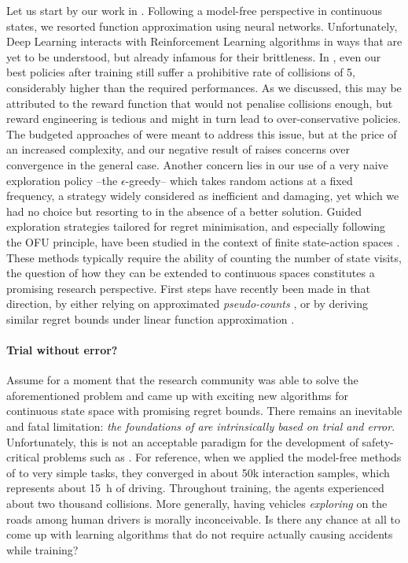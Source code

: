 Let us start by our work in . Following a model-free perspective in continuous states, we resorted function approximation using neural networks. Unfortunately, Deep Learning interacts with Reinforcement Learning algorithms in ways that are yet to be understood, but already infamous for their brittleness. In , even our best policies after training still suffer a prohibitive rate of collisions of \SI{5}{\per}, considerably higher than the required performances. 
As we discussed, this may be attributed to the reward function that would not penalise collisions enough, but reward engineering is tedious and might in turn lead to over-conservative policies. The budgeted approaches of  were meant to address this issue, but at the price of an increased complexity, and our negative result of  raises concerns over convergence in the general case. 
Another concern lies in our use of a very naive exploration policy --the $\epsilon$-greedy-- which takes random actions at a fixed frequency, a strategy widely considered as inefficient and damaging, yet which we had no choice but resorting to in the absence of a better solution. Guided exploration strategies tailored for regret minimisation, and especially following the \gls{OFU} principle, have been studied in the context of finite state-action spaces \citep{Auer2009,Azar2017}. 
These methods typically require the ability of counting the number of state visits, the question of how they can be extended to continuous spaces constitutes a promising research perspective. First steps have recently been made in that direction, by either relying on approximated \emph{pseudo-counts} \citep{Guyon2017}, or by deriving similar regret bounds under linear function approximation \citep{Jin2020}.

\paragraph{Trial without error?}

Assume for a moment that the research community was able to solve the aforementioned problem and came up with exciting new algorithms for continuous state space with promising regret bounds. There remains an inevitable and fatal limitation: \emph{the foundations of  are intrinsically based on trial and error}. Unfortunately, this is not an acceptable paradigm for the development of safety-critical problems such as . For reference, when we applied the model-free methods of  to very simple tasks, they converged in about 50k interaction samples, which represents about \SI{15}{\hour} of driving. Throughout training, the agents experienced about two thousand collisions. More generally, having vehicles \emph{exploring} on the roads among human drivers is morally inconceivable. Is there any chance at all to come up with learning algorithms that do not require actually causing accidents while training?


